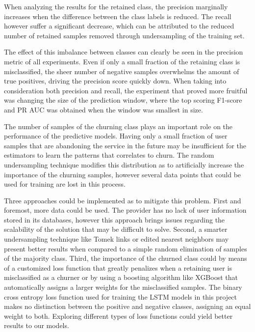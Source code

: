 \documentclass{kththesis}
\begin{document}
When analyzing the results for the retained class, the precision marginally increases when the difference between the class labels is reduced. The recall however suffer a significant decrease, which can be attributed to the reduced number of retained samples removed through undersampling of the training set.

The effect of this imbalance between classes can clearly be seen in the precision metric of all experiments. Even if only a small fraction of the retaining class is misclassified, the sheer number of negative samples overwhelms the amount of true positives, driving the precision score quickly down. When taking into consideration both precision and recall, the experiment that proved more fruitful was changing the size of the prediction window, where the top scoring F1-score and PR AUC was obtained when the window was smallest in size. 

The number of samples of the churning class plays an important role on the performance of the predictive models. Having only a small fraction of user samples that are abandoning the service in the future may be insufficient for the estimators to learn the patterns that correlates to churn. The random undersampling technique modifies this distribution as to artificially increase the importance of the churning samples, however several data points that could be used for training are lost in this process. 

Three approaches could be implemented as to mitigate this problem. First and foremost, more data could be used. The provider has no lack of user information stored in its databases, however this approach brings issues regarding the scalability of the solution that may be difficult to solve. Second, a smarter undersampling technique like Tomek links \citep{tomek1976two} or edited nearest neighbors \citep{smith2014instance} may present better results when compared to a simple random elimination of samples of the majority class. Third, the importance of the churned class could by means of a customized loss function that greatly penalizes when a retaining user is misclassified as a churner or by using a boosting algorithm like XGBoost \citep{chen2016xgboost} that automatically assigns a larger weights for the misclassified samples. The binary cross entropy loss function used for training the LSTM models in this project makes no distinction between the positive and negative classes, assigning an equal weight to both. Exploring different types of loss functions could yield better results to our models.
\end{document}
